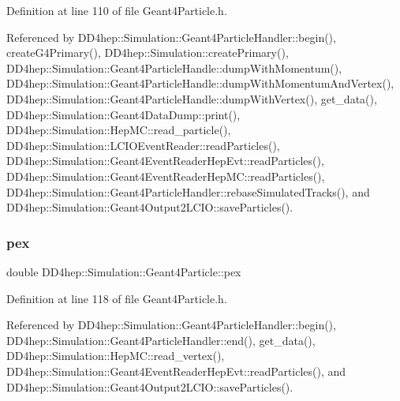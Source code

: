 Definition at line 110 of file Geant4\+Particle.\+h.



Referenced by D\+D4hep\+::\+Simulation\+::\+Geant4\+Particle\+Handler\+::begin(), create\+G4\+Primary(), D\+D4hep\+::\+Simulation\+::create\+Primary(), D\+D4hep\+::\+Simulation\+::\+Geant4\+Particle\+Handle\+::dump\+With\+Momentum(), D\+D4hep\+::\+Simulation\+::\+Geant4\+Particle\+Handle\+::dump\+With\+Momentum\+And\+Vertex(), D\+D4hep\+::\+Simulation\+::\+Geant4\+Particle\+Handle\+::dump\+With\+Vertex(), get\+\_\+data(), D\+D4hep\+::\+Simulation\+::\+Geant4\+Data\+Dump\+::print(), D\+D4hep\+::\+Simulation\+::\+Hep\+M\+C\+::read\+\_\+particle(), D\+D4hep\+::\+Simulation\+::\+L\+C\+I\+O\+Event\+Reader\+::read\+Particles(), D\+D4hep\+::\+Simulation\+::\+Geant4\+Event\+Reader\+Hep\+Evt\+::read\+Particles(), D\+D4hep\+::\+Simulation\+::\+Geant4\+Event\+Reader\+Hep\+M\+C\+::read\+Particles(), D\+D4hep\+::\+Simulation\+::\+Geant4\+Particle\+Handler\+::rebase\+Simulated\+Tracks(), and D\+D4hep\+::\+Simulation\+::\+Geant4\+Output2\+L\+C\+I\+O\+::save\+Particles().

\hypertarget{class_d_d4hep_1_1_simulation_1_1_geant4_particle_a6ac77a569db28fb000fa4cd33c6dbc25}{}\label{class_d_d4hep_1_1_simulation_1_1_geant4_particle_a6ac77a569db28fb000fa4cd33c6dbc25} 
\subsubsection{\texorpdfstring{pex}{pex}}
{\footnotesize\ttfamily double D\+D4hep\+::\+Simulation\+::\+Geant4\+Particle\+::pex}



Definition at line 118 of file Geant4\+Particle.\+h.



Referenced by D\+D4hep\+::\+Simulation\+::\+Geant4\+Particle\+Handler\+::begin(), D\+D4hep\+::\+Simulation\+::\+Geant4\+Particle\+Handler\+::end(), get\+\_\+data(), D\+D4hep\+::\+Simulation\+::\+Hep\+M\+C\+::read\+\_\+vertex(), D\+D4hep\+::\+Simulation\+::\+Geant4\+Event\+Reader\+Hep\+Evt\+::read\+Particles(), and D\+D4hep\+::\+Simulation\+::\+Geant4\+Output2\+L\+C\+I\+O\+::save\+Particles().

\hypertarget{class_d_d4hep_1_1_simulation_1_1_geant4_particle_a17f6e47420fc54bc5b6440e26f0181e2}{}\label{class_d_d4hep_1_1_simulation_1_1_geant4_particle_a17f6e47420fc54bc5b6440e26f0181e2} 
